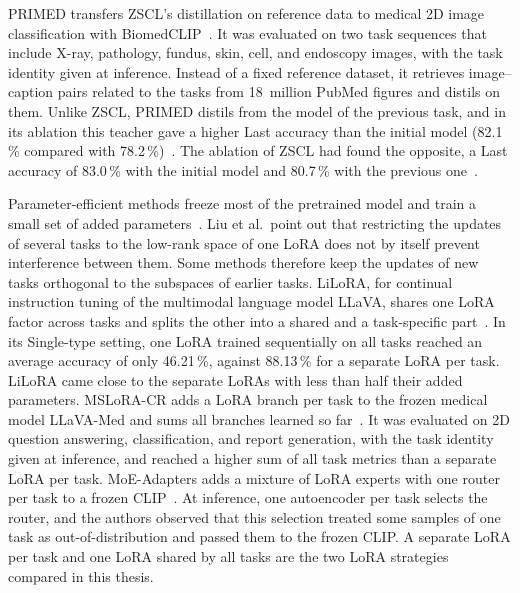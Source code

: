 PRIMED transfers ZSCL's distillation on reference data to medical 2D image classification with BiomedCLIP~\cite{chen2025forgingdynamicmemoryretrievalguided}.
It was evaluated on two task sequences that include X-ray, pathology, fundus, skin, cell, and endoscopy images, with the task identity given at inference.
Instead of a fixed reference dataset, it retrieves image--caption pairs related to the tasks from 18~million PubMed figures and distils on them.
Unlike ZSCL, PRIMED distils from the model of the previous task, and in its ablation this teacher gave a higher Last accuracy than the initial model (82.1\,\% compared with 78.2\,\%)~\cite[Table~4a]{chen2025forgingdynamicmemoryretrievalguided}.
The ablation of ZSCL had found the opposite, a Last accuracy of 83.0\,\% with the initial model and 80.7\,\% with the previous one~\cite[Table~1d]{zheng2023preventingzeroshottransferdegradation}.

Parameter-efficient methods freeze most of the pretrained model and train a small set of added parameters~\cite[Sec.~4.3]{liu2026continuallearningvlmssurvey}.
Liu et al.\ point out that restricting the updates of several tasks to the low-rank space of one LoRA does not by itself prevent interference between them.
Some methods therefore keep the updates of new tasks orthogonal to the subspaces of earlier tasks.
LiLoRA, for continual instruction tuning of the multimodal language model LLaVA, shares one LoRA factor across tasks and splits the other into a shared and a task-specific part~\cite{che2026loraloraparameterefficientarchitecture}.
In its Single-type setting, one LoRA trained sequentially on all tasks reached an average accuracy of only 46.21\,\%, against 88.13\,\% for a separate LoRA per task.
LiLoRA came close to the separate LoRAs with less than half their added parameters.
MSLoRA-CR adds a LoRA branch per task to the frozen medical model LLaVA-Med and sums all branches learned so far~\cite{Zhang_2025}.
It was evaluated on 2D question answering, classification, and report generation, with the task identity given at inference, and reached a higher sum of all task metrics than a separate LoRA per task.
MoE-Adapters adds a mixture of LoRA experts with one router per task to a frozen CLIP~\cite{yu2024boostingcontinuallearningvisionlanguage}.
At inference, one autoencoder per task selects the router, and the authors observed that this selection treated some samples of one task as out-of-distribution and passed them to the frozen CLIP.
A separate LoRA per task and one LoRA shared by all tasks are the two LoRA strategies compared in this thesis.

